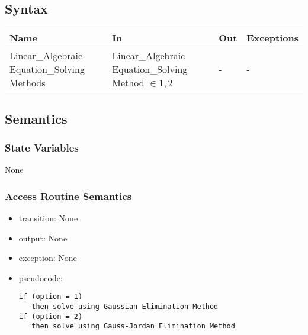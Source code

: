 \documentclass[12pt, titlepage]{article}
\begin{document}
\subsection{Syntax}

\begin{center}
\begin{tabular}{p{4cm} p{4cm} p{2cm} p{2cm}}
\hline
\textbf{Name} & \textbf{In} & \textbf{Out} & \textbf{Exceptions} \\
\hline
Linear\_Algebraic Equation\_Solving Methods & Linear\_Algebraic
Equation\_Solving Method $\in {1, 2}$& - & - \\

\hline
\end{tabular}
\end{center}


\subsection{Semantics}

\subsubsection{State Variables}

None


\subsubsection{Access Routine Semantics}

\noindent %
\begin{itemize}
\item transition: None %
\item output: None%
\item exception: None%
\item pseudocode: 
\begin{lstlisting}
if (option = 1)
   then solve using Gaussian Elimination Method
if (option = 2)
   then solve using Gauss-Jordan Elimination Method 
\end{lstlisting}
\end{itemize}

\end{document}
